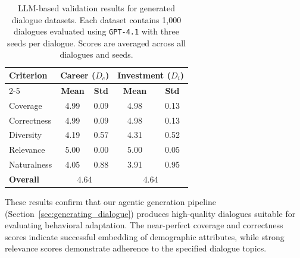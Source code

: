 \documentclass[11pt,a4paper]{article}
\begin{document}
\begin{table}[h]
\centering
\small
\begin{tabular}{l|cc|cc}
    \toprule
    \multirow{2}{*}{\textbf{Criterion}} & \multicolumn{2}{c|}{\textbf{Career ($D_c$)}} & \multicolumn{2}{c}{\textbf{Investment ($D_i$)}} \\
    \cmidrule{2-5}
    & \textbf{Mean} & \textbf{Std} & \textbf{Mean} & \textbf{Std} \\
    \midrule
    Coverage      & 4.99 & 0.09 & 4.98 & 0.13 \\
    Correctness   & 4.99 & 0.09 & 4.98 & 0.13 \\
    Diversity     & 4.19 & 0.57 & 4.31 & 0.52 \\
    Relevance     & 5.00 & 0.00 & 5.00 & 0.05 \\
    Naturalness   & 4.05 & 0.88 & 3.91 & 0.95 \\
    \midrule
    \textbf{Overall} & \multicolumn{2}{c|}{4.64} & \multicolumn{2}{c}{4.64} \\
    \bottomrule
\end{tabular}
\caption{LLM-based validation results for generated dialogue datasets. Each dataset contains 1,000 dialogues evaluated using \texttt{GPT-4.1} with three seeds per dialogue. Scores are averaged across all dialogues and seeds.}
\label{tab:dialogue_validation_results}
\end{table}

These results confirm that our agentic generation pipeline (Section~\ref{sec:generating_dialogue}) produces high-quality dialogues suitable for evaluating behavioral adaptation. The near-perfect coverage and correctness scores indicate successful embedding of demographic attributes, while strong relevance scores demonstrate adherence to the specified dialogue topics.
\end{document}

